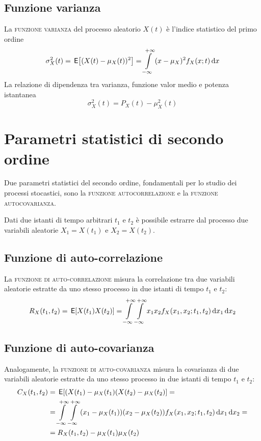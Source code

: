 \subsection{Funzione varianza}
La \textsc{funzione varianza} del processo aleatorio $X(t)$ è l'indice statistico del primo ordine 
\begin{equation}
\sigma^2_X(t)=\,{\operatorname{\mathsf{E}}}\!\left[{(X(t)-\mu_X(t))^2}\right]=\int\limits_{-\infty}^{+\infty}{(x-\mu_X)^2 f_X(x;t)}{\,\mathop{}\!\mathrm{d}{x}}
\end{equation}
La relazione di dipendenza tra varianza, funzione valor medio e potenza istantanea
\begin{equation}
\sigma^2_X(t)=P_X(t)-\mu^2_X(t)
\end{equation}

\section{Parametri statistici di secondo ordine}
Due parametri statistici del secondo ordine, fondamentali per lo studio dei processi stocastici, sono la \textsc{funzione autocorrelazione} e la \textsc{funzione autocovarianza}.

Dati due istanti di tempo arbitrari $t_1$ e $t_2$ è possibile estrarre dal processo due variabili aleatorie $X_1=X(t_1)$ e $X_2=X(t_2)$.

\subsection{Funzione di auto-correlazione}
La \textsc{funzione di auto-correlazione} misura la correlazione tra due variabili aleatorie estratte da uno stesso processo in due istanti di tempo $t_1$ e $t_2$:
\begin{equation}\label{eq:proc_autocorrelazione}
R_X(t_1,t_2)=\,{\operatorname{\mathsf{E}}}\!\left[{X(t_1)X(t_2)}\right]=\int\limits_{-\infty}^{+\infty}{\int\limits_{-\infty}^{+\infty}{x_1 x_2 f_X(x_1,x_2;t_1,t_2)}{\,\mathop{}\!\mathrm{d}{x_1}}}{\,\mathop{}\!\mathrm{d}{x_2}}
\end{equation}

\subsection{Funzione di auto-covarianza}
Analogamente, la \textsc{funzione di auto-covarianza} misura la covarianza di due variabili aleatorie estratte da uno stesso processo in due istanti di tempo $t_1$ e $t_2$:
\begin{equation}\label{eq:proc_autocovarianza}\begin{split}
C_X(t_1,t_2)&=\,{\operatorname{\mathsf{E}}}\!\left[{(X(t_1)-\mu_X(t_1)(X(t_2)-\mu_X(t_2)}\right]=\\
&=\int\limits_{-\infty}^{+\infty}{\int\limits_{-\infty}^{+\infty}{(x_1-\mu_X(t_1))(x_2-\mu_X(t_2)) f_X(x_1,x_2;t_1,t_2)}{\,\mathop{}\!\mathrm{d}{x_1}}}{\,\mathop{}\!\mathrm{d}{x_2}}=\\
&=R_X(t_1,t_2)-\mu_X(t_1)\mu_X(t_2)
\end{split}\end{equation}

